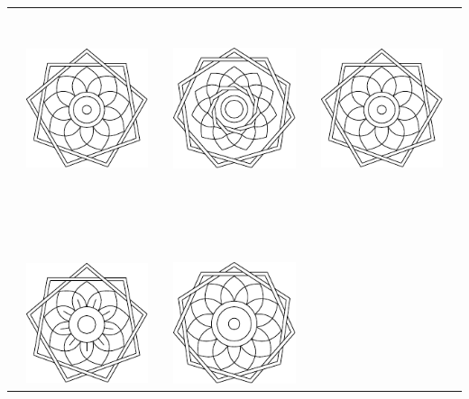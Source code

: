 \documentclass{article}
\begin{document}
\begin{table}

\begin{tabular}{|p{1em}|l|p{1em}|l|p{1em}|l|p{1em}|}
  
\hline
\hline
&&&&&& \tabularnewline
&&&&&& \tabularnewline
&&&&&& \tabularnewline
&&&&&& \tabularnewline
&&&&&& \tabularnewline
&&&&&& \tabularnewline
&&&&&& \tabularnewline
&&&&&& \tabularnewline
&
\includegraphics[width=0.25\linewidth]{9/2.pdf} 
& &
\includegraphics[width=0.25\linewidth]{11/3.pdf} 
& &
\includegraphics[width=0.25\linewidth]{9/2.pdf} 
&
\tabularnewline
&&&&&& \tabularnewline
&&&&&& \tabularnewline
&&&&&& \tabularnewline
&&&&&& \tabularnewline
&&&&&& \tabularnewline
&&&&&& \tabularnewline
&&&&&& \tabularnewline
&&&&&& \tabularnewline
\hline
\tabularnewline
\tabularnewline
\hline
&&&&&& \tabularnewline
&&&&&& \tabularnewline
&&&&&& \tabularnewline
&&&&&& \tabularnewline
&&&&&& \tabularnewline
&&&&&& \tabularnewline
&&&&&& \tabularnewline
&&&&&& \tabularnewline
&
\includegraphics[width=0.25\linewidth]{9/1.pdf} 
& & 
\includegraphics[width=0.25\linewidth]{11/2.pdf} 

\end{tabular}
\end{table}
\end{document}
